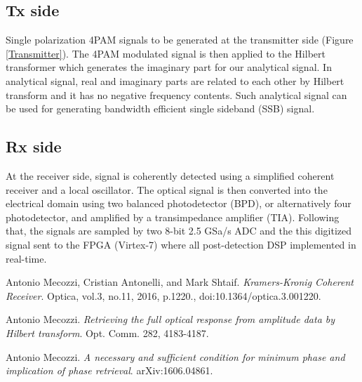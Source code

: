 \subsection{Tx side}
Single polarization 4PAM signals to be generated at the transmitter side (Figure \ref{Transmitter}). The 4PAM modulated signal is then applied to the Hilbert transformer which generates the imaginary part for our analytical signal. In analytical signal, real and imaginary parts are related to each other by Hilbert transform and it has no negative frequency contents. Such analytical signal can be used for generating bandwidth efficient single sideband (SSB) signal.  

\subsection{Rx side}
At the receiver side, signal is coherently detected using a simplified coherent receiver and a local oscillator. The optical signal is then converted into the electrical domain using two balanced photodetector (BPD), or alternatively four photodetector, and amplified by a transimpedance amplifier (TIA). Following that, the signals are sampled by two 8-bit 2.5 GSa/s ADC and the this digitized signal sent to the FPGA (Virtex-7) where all post-detection DSP implemented in real-time.

\begin{thebibliography}{9}
	Antonio Mecozzi, Cristian Antonelli, and Mark Shtaif.
	\textit{Kramers-Kronig Coherent Receiver}.
	Optica, vol.3, no.11, 2016, p.1220., doi:10.1364/optica.3.001220.
	
	Antonio Mecozzi.
	\textit{Retrieving the full optical response from amplitude data by Hilbert transform}. Opt. Comm. 282, 4183-4187.
	
	Antonio Mecozzi.
	\textit{A necessary and sufficient condition for minimum phase and implication of phase retrieval}. arXiv:1606.04861.
\end{thebibliography}










